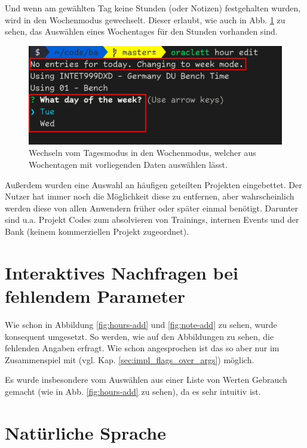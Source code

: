 \documentclass[oneside,bibliography=totocnumbered,BCOR=5mm]{scrbook}
\begin{document}
Und wenn am gewählten Tag keine Stunden (oder Notizen) festgehalten wurden,
wird in den Wochenmodus gewechselt. Dieser erlaubt, wie auch in Abb.
\ref{fig:day-week-mode} zu sehen, das Auswählen eines Wochentages für den
Stunden vorhanden sind.

\begin{figure}[H]
  \centering
  \includegraphics[scale=0.6]{day-week-mode.png}
  \caption{Wechseln vom Tagesmodus in den Wochenmodus, welcher aus Wochentagen mit vorliegenden Daten auswählen lässt.}
  \label{fig:day-week-mode}
\end{figure}

Außerdem wurden eine Auswahl an häufigen geteilten Projekten eingebettet. Der
Nutzer hat immer noch die Möglichkeit diese zu entfernen, aber wahrscheinlich
werden diese von allen Anwendern früher oder später einmal benötigt. Darunter
sind u.a. Projekt Codes zum absolvieren von Trainings, internen Events und der
Bank (keinem kommerziellen Projekt zugeordnet).

\section{Interaktives Nachfragen bei fehlendem Parameter}

Wie schon in Abbildung \ref{fig:hours-add} und \ref{fig:note-add} zu
sehen, wurde  konsequent umgesetzt.
So werden, wie auf den Abbildungen zu sehen, die fehlenden Angaben
erfragt. Wie schon angesprochen ist das so aber nur im Zusammenspiel mit
 (vgl. Kap. \ref{sec:impl_flags_over_args})
möglich.

Es wurde insbesondere vom Auswählen aus einer Liste von Werten Gebrauch gemacht
(wie in Abb. \ref{fig:hours-add} zu sehen), da es sehr intuitiv ist.

\section{Natürliche Sprache}
\label{sec:sol-natural-lang}
\end{document}
